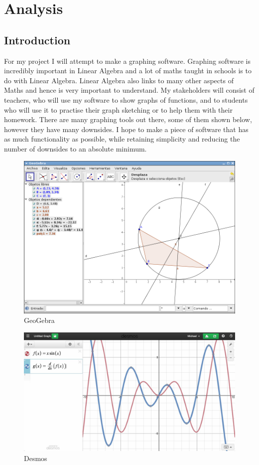 \documentclass[../../main.tex]{subfiles}
\begin{document}
\part{Analysis}
\chapter{Introduction}
For my project I will attempt to make a graphing software. Graphing software is incredibly important in Linear Algebra and a lot of maths taught in schools is to do with Linear Algebra. Linear Algebra also links to many other aspects of Maths and hence is very important to understand. My stakeholders will consist of teachers, who will use my software to show graphs of functions, and to students who will use it to practise their graph sketching or to help them with their homework. There are many graphing tools out there, some of them shown below, however they have many downsides. I hope to make a piece of software that has as much functionality as possible, while retaining simplicity and reducing the number of downsides to an absolute minimum.
\begin{figure}[H]
	\centering
	\includegraphics[width=.4\textwidth]{geogebraEx}
	\caption{GeoGebra}
\end{figure}
\begin{figure}[H]
	\centering
	\includegraphics[width=.4\textwidth]{desmosEx}
	\caption{Desmos}
\end{figure}
\end{document}
